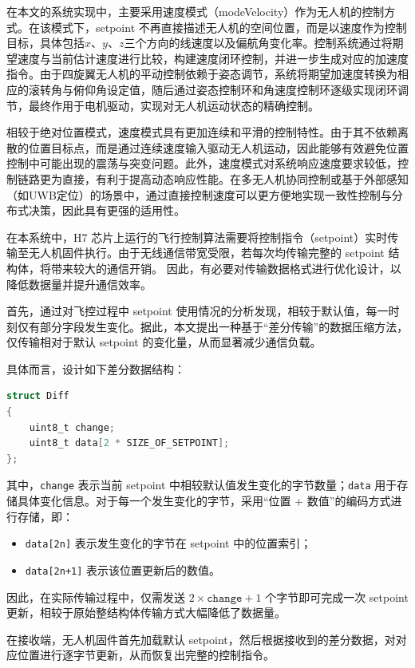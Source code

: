 在本文的系统实现中，主要采用速度模式（modeVelocity）作为无人机的控制方式。在该模式下，setpoint 不再直接描述无人机的空间位置，而是以速度作为控制目标，具体包括$x$、$y$、$z$三个方向的线速度以及偏航角变化率。控制系统通过将期望速度与当前估计速度进行比较，构建速度闭环控制，并进一步生成对应的加速度指令。由于四旋翼无人机的平动控制依赖于姿态调节，系统将期望加速度转换为相应的滚转角与俯仰角设定值，随后通过姿态控制环和角速度控制环逐级实现闭环调节，最终作用于电机驱动，实现对无人机运动状态的精确控制。

相较于绝对位置模式，速度模式具有更加连续和平滑的控制特性。由于其不依赖离散的位置目标点，而是通过连续速度输入驱动无人机运动，因此能够有效避免位置控制中可能出现的震荡与突变问题。此外，速度模式对系统响应速度要求较低，控制链路更为直接，有利于提高动态响应性能。在多无人机协同控制或基于外部感知（如UWB定位）的场景中，通过直接控制速度可以更方便地实现一致性控制与分布式决策，因此具有更强的适用性。



在本系统中，H7 芯片上运行的飞行控制算法需要将控制指令（setpoint）实时传输至无人机固件执行。由于无线通信带宽受限，若每次均传输完整的 setpoint 结构体，将带来较大的通信开销。
因此，有必要对传输数据格式进行优化设计，以降低数据量并提升通信效率。

首先，通过对飞控过程中 setpoint 使用情况的分析发现，相较于默认值，每一时刻仅有部分字段发生变化。据此，本文提出一种基于“差分传输”的数据压缩方法，仅传输相对于默认 setpoint 的变化量，从而显著减少通信负载。

具体而言，设计如下差分数据结构：
\begin{lstlisting}[language=C]
struct Diff
{
    uint8_t change;
    uint8_t data[2 * SIZE_OF_SETPOINT];
};
\end{lstlisting}

其中，\texttt{change} 表示当前 setpoint 中相较默认值发生变化的字节数量；\texttt{data} 用于存储具体变化信息。对于每一个发生变化的字节，采用“位置 + 数值”的编码方式进行存储，即：
\begin{itemize}
    \item \texttt{data[2n]} 表示发生变化的字节在 setpoint 中的位置索引；
    \item \texttt{data[2n+1]} 表示该位置更新后的数值。
\end{itemize}

因此，在实际传输过程中，仅需发送 $2 \times \texttt{change} + 1$ 个字节即可完成一次 setpoint 更新，相较于原始整结构体传输方式大幅降低了数据量。

在接收端，无人机固件首先加载默认 setpoint，然后根据接收到的差分数据，对对应位置进行逐字节更新，从而恢复出完整的控制指令。

